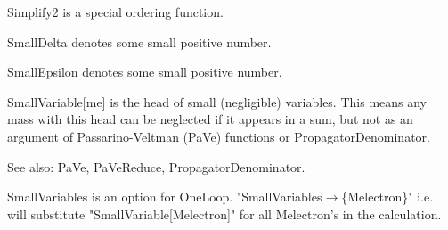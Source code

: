 








Simplify2 is a special ordering function.





SmallDelta denotes some small positive number.



SmallEpsilon denotes some small positive number.



SmallVariable[me] is the head of small (negligible) variables. This means any mass with this head can be neglected if it appears in a
  sum, but not as an argument of Passarino-Veltman (PaVe) functions or PropagatorDenominator.

See also:  PaVe, PaVeReduce, PropagatorDenominator.



SmallVariables is an option for OneLoop. "SmallVariables\(\rightarrow \)\{Melectron\}" i.e. will substitute "SmallVariable[Melectron]" {
  }for all Melectron's in the calculation.

